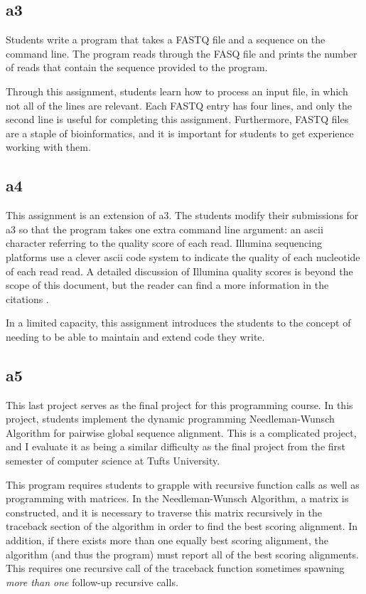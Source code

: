 \documentclass{report}
\begin{document}
\subsection{a3}
Students write a program that takes a FASTQ file and a sequence on the command line. The program reads through the FASQ file and prints the number of reads that contain the sequence provided to the program.

Through this assignment, students learn how to process an input file, in which not all of the lines are relevant. Each FASTQ entry has four lines, and only the second line is useful for completing this assignment. Furthermore, FASTQ files are a staple of bioinformatics, and it is important for students to get experience working with them.

\subsection{a4}
This assignment is an extension of a3. The students modify their submissions for a3 so that the program takes one extra command line argument: an ascii character referring to the quality score of each read. Illumina sequencing platforms use a clever ascii code system to indicate the quality of each nucleotide of each read read. A detailed discussion of Illumina quality scores is beyond the scope of this document, but the reader can find a more information in the citations \cite{cock2010sanger}.

In a limited capacity, this assignment introduces the students to the concept of needing to be able to maintain and extend code they write.

\subsection{a5}
This last project serves as the final project for this programming course. In this project, students implement the dynamic programming Needleman-Wunsch Algorithm for pairwise global sequence alignment. This is a complicated project, and I evaluate it as being a similar difficulty as the final project from the first semester of computer science at Tufts University.

This program requires students to grapple with recursive function calls as well as programming with matrices. In the Needleman-Wunsch Algorithm, a matrix is constructed, and it is necessary to traverse this matrix recursively in the traceback section of the algorithm in order to find the best scoring alignment. In addition, if there exists more than one equally best scoring alignment, the algorithm (and thus the program) must report all of the best scoring alignments. This requires one recursive call of the traceback function sometimes spawning \emph{more than one} follow-up recursive calls.
\end{document}
